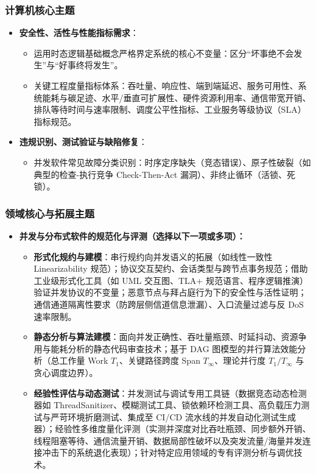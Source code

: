 \subsubsection{计算机核心主题}
\begin{itemize}
    \item \textbf{安全性、活性与性能指标需求}：
    \begin{itemize}
        \item 运用时态逻辑基础概念严格界定系统的核心不变量：区分“坏事绝不会发生”与“好事终将发生”。
        \item 关键工程度量指标体系：吞吐量、响应性、端到端延迟、服务可用性、系统能耗与碳足迹、水平/垂直可扩展性、硬件资源利用率、通信带宽开销、排队等待时间与速率限制、调度公平性指标、工业服务等级协议（SLA）指标规范。
    \end{itemize}
    \item \textbf{违规识别、测试验证与缺陷修复}：
    \begin{itemize}
        \item 并发软件常见故障分类识别：时序定序缺失（竞态错误）、原子性破裂（如典型的检查-执行竞争 Check-Then-Act 漏洞）、非终止循环（活锁、死锁）。
    \end{itemize}
\end{itemize}

\subsubsection{领域核心与拓展主题}
\begin{itemize}
    \item \textbf{并发与分布式软件的规范化与评测（选择以下一项或多项）：}
    \begin{itemize}
        \item \textbf{形式化规约与建模}：串行规约向并发语义的拓展（如线性一致性 Linearizability 规范）；协议交互契约、会话类型与跨节点事务规范；借助工业级形式化工具（如 UML 交互图、TLA+ 规范语言、程序逻辑推演）验证并发协议的不变量；恶意节点与拜占庭行为下的安全性与活性证明；通信通道隔离性要求（防跨层侧信道信息泄漏）、入口流量过滤与反 DoS 速率限制。
        \item \textbf{静态分析与算法建模}：面向并发正确性、吞吐量瓶颈、时延抖动、资源争用与能耗分析的静态代码审查技术；基于 DAG 图模型的并行算法效能分析（总工作量 Work $T_1$、关键路径跨度 Span $T_\infty$、理论并行度 $T_1/T_\infty$ 与贪心调度边界）。
        \item \textbf{经验性评估与动态测试}：并发测试与调试专用工具链（数据竞态动态检测器如 ThreadSanitizer、模糊测试工具、锁依赖环检测工具、高负载压力测试与严苛环境折磨测试、集成至 CI/CD 流水线的并发自动化测试生成器）；经验性多维度量化评测（实测并深度对比吞吐瓶颈、同步额外开销、线程阻塞等待、通信流量开销、数据局部性破坏以及突发流量/海量并发连接冲击下的系统退化表现）；针对特定应用领域的专有评测分析与调优技术。
    \end{itemize}
\end{itemize}

